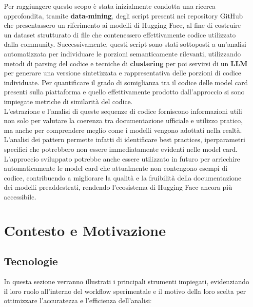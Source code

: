 \documentclass{article}
\begin{document}
Per raggiungere questo scopo è stata inizialmente condotta una ricerca approfondita, tramite \textbf{data-mining}, degli script presenti nei repository GitHub che presentassero un riferimento ai modelli di Hugging Face, al fine di costruire un dataset strutturato di file che contenessero effettivamente codice utilizzato dalla community. Successivamente, questi script sono stati sottoposti a un’analisi automatizzata per individuare le porzioni semanticamente rilevanti, utilizzando metodi di parsing del codice e tecniche di \textbf{clustering} per poi servirsi di un \textbf{LLM} per generare una versione sintetizzata e rappresentativa delle porzioni di codice individuate. Per quantificare il grado di somiglianza tra il codice delle model card presenti sulla piattaforma e quello effettivamente prodotto dall'approccio si sono impiegate metriche di similarità del codice.\\
L’estrazione e l’analisi di queste sequenze di codice forniscono informazioni utili non solo per valutare la coerenza tra documentazione ufficiale e utilizzo pratico, ma anche per comprendere meglio come i modelli vengono adottati nella realtà. L’analisi dei pattern permette infatti di identificare best practices, iperparametri specifici che potrebbero non essere immediatamente evidenti nelle model card.
L’approccio sviluppato potrebbe anche essere utilizzato in futuro per arricchire automaticamente le model card che attualmente non contengono esempi di codice, contribuendo a migliorare la qualità e la fruibilità della documentazione dei modelli preaddestrati, rendendo l’ecosistema di Hugging Face ancora più accessibile.


\section{Contesto e Motivazione}
\subsection{Tecnologie}
In questa sezione verranno illustrati i principali strumenti impiegati, evidenziando il loro ruolo all'interno del workflow sperimentale e il motivo della loro scelta per ottimizzare l'accuratezza e l'efficienza dell’analisi:
\end{document}
